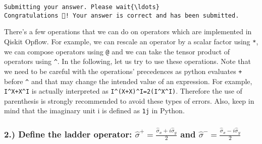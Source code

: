 \documentclass[11pt]{article}
\begin{document}
    \begin{Verbatim}[commandchars=\\\{\}]
Submitting your answer. Please wait{\ldots}
Congratulations 🎉! Your answer is correct and has been submitted.
    \end{Verbatim}

    There's a few operations that we can do on operators which are
implemented in Qiskit Opflow. For example, we can rescale an operator by
a scalar factor using \texttt{*}, we can compose operators using
\texttt{@} and we can take the tensor product of operators using
\texttt{\^{}}. In the following, let us try to use these operations.
Note that we need to be careful with the operations' precedences as
python evaluates \texttt{+} before \texttt{\^{}} and that may change the
intended value of an expression. For example, \texttt{I\^{}X+X\^{}I} is
actually interpreted as \texttt{I\^{}(X+X)\^{}I=2(I\^{}X\^{}I)}.
Therefore the use of parenthesis is strongly recommended to avoid these
types of errors. Also, keep in mind that the imaginary unit i is defined
as \texttt{1j} in Python.

\hypertarget{define-the-ladder-operator-hatsigma-frac-hatsigma_x-i-hatsigma_y2-and-hatsigma--frachatsigma_x---i-hatsigma_y2}{%
\subsubsection{\texorpdfstring{2.) Define the ladder operator:
\(\hat{\sigma}^{+} = \frac{ \hat{\sigma}_x + i \hat{\sigma}_y}{2}\) and
\(\hat{\sigma}^{-} = \frac{\hat{\sigma}_x - i \hat{\sigma}_y}{2}\)}{2.) Define the ladder operator: \textbackslash hat\{\textbackslash sigma\}\^{}\{+\} = \textbackslash frac\{ \textbackslash hat\{\textbackslash sigma\}\_x + i \textbackslash hat\{\textbackslash sigma\}\_y\}\{2\} and \textbackslash hat\{\textbackslash sigma\}\^{}\{-\} = \textbackslash frac\{\textbackslash hat\{\textbackslash sigma\}\_x - i \textbackslash hat\{\textbackslash sigma\}\_y\}\{2\}}}\label{define-the-ladder-operator-hatsigma-frac-hatsigma_x-i-hatsigma_y2-and-hatsigma--frachatsigma_x---i-hatsigma_y2}}
\end{document}
